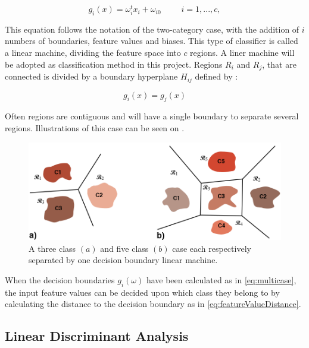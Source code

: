 \begin{equation} \label{eq:multicase}
g_{i}(x) = \omega^{t}_{i}x_{i} +\omega_{i0} ~~~~~~~~~~~ i = 1,...,c,
\end{equation}

This equation follows the notation of the two-category case, with the addition of $i$ numbers of boundaries, feature values and biases. This type of classifier is called a linear machine, dividing the feature space into $c$ regions. A liner machine will be adopted as classification method in this project. Regions $R_i$ and $R_j$, that are connected is divided by a boundary hyperplane $H_{ij}$ defined by \cite{Duda2000}:

\begin{equation}
g_i(x) = g_j(x)
\end{equation}

Often regions are contiguous and will have a single boundary to separate several regions. \cite{Duda2000} Illustrations of this case can be seen on . 

\begin{figure}[H]                 
	\includegraphics[width=.6\textwidth]{figures/xBackground/LMregions}  
	\caption{A three class $(a)$ and five class $(b)$ case each respectively separated by one decision boundary linear machine. \cite{Duda2000}}
	\label{fig:LMregions} 
\end{figure}

When the decision boundaries $g_i(\omega)$ have been calculated as in \eqref{eq:multicase}, the input feature values can be decided upon which class they belong to by calculating the distance to the decision boundary as in \eqref{eq:featureValueDistance}. 


\subsection{Linear Discriminant Analysis} \label{sub:BG:LDA}

